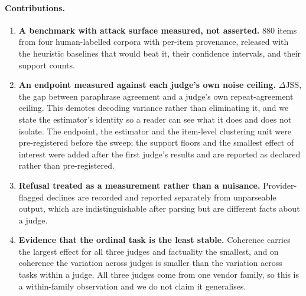 \paragraph{Contributions.}
\begin{enumerate}
  \item \textbf{A benchmark with attack surface measured, not asserted.} 880
    items from four human-labelled corpora with per-item provenance, released
    with the heuristic baselines that would beat it, their confidence intervals,
    and their support counts.
  \item \textbf{An endpoint measured against each judge's own noise ceiling.}
    $\Delta\mathrm{JSS}$, the gap between paraphrase agreement and a judge's own
    repeat-agreement ceiling. This demotes decoding variance rather than
    eliminating it, and we state the estimator's identity so a reader can see
    what it does and does not isolate. The endpoint, the estimator and the
    item-level clustering unit were pre-registered before the sweep; the support
    floors and the smallest effect of interest were added after the first
    judge's results and are reported as declared rather than pre-registered.
  \item \textbf{Refusal treated as a measurement rather than a nuisance.}
    Provider-flagged declines are recorded and reported separately from
    unparseable output, which are indistinguishable after parsing but are
    different facts about a judge.
  \item \textbf{Evidence that the ordinal task is the least stable.} Coherence
    carries the largest effect for all three judges and factuality the smallest,
    and on coherence the variation across judges is smaller than the variation
    across tasks within a judge. All three judges come from one vendor family, so
    this is a within-family observation and we do not claim it generalises.
\end{enumerate}
